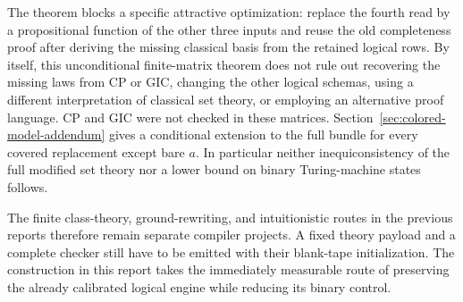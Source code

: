 The theorem blocks a specific attractive optimization: replace the
fourth read by a propositional function of the other three inputs and
reuse the old completeness proof after deriving the missing classical
basis from the retained logical rows.  By itself, this unconditional
finite-matrix theorem does not rule out recovering the missing laws
from CP or GIC, changing the other logical schemas,
using a different interpretation of classical set theory, or employing
an alternative proof language.  CP and GIC were not checked in these
matrices.  Section~\ref{sec:colored-model-addendum} gives a conditional
extension to the full bundle for every covered replacement except bare $a$.
In particular neither inequiconsistency of the full modified
set theory nor a lower bound on binary Turing-machine states follows.

The finite class-theory, ground-rewriting, and intuitionistic routes in
the previous reports therefore remain separate compiler projects.
A fixed theory payload and a complete checker still have to be emitted
with their blank-tape initialization.  The construction in this
report takes the immediately measurable route of preserving the
already calibrated logical engine while reducing its binary control.
